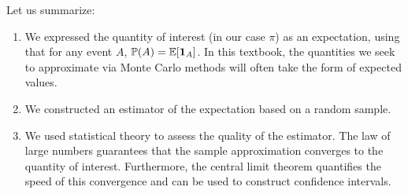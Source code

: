 Let us summarize:
\begin{enumerate}
  \item We expressed the quantity of interest (in our case $\pi$) as an expectation, using that for any
        event $A$, $\mathbb{P}(A) = \mathbb{E}[\mathbf{1}_A]$. In this textbook, the quantities we seek to
        approximate via Monte Carlo methods will often take the form of expected values.
  \item We constructed an estimator of the expectation based on a random sample.
  \item We used statistical theory to assess the quality of the estimator. The law of large numbers
        guarantees that the sample approximation converges to the quantity of interest.
        Furthermore, the central limit theorem quantifies the speed of this convergence and can be used
        to construct confidence intervals.
\end{enumerate}
